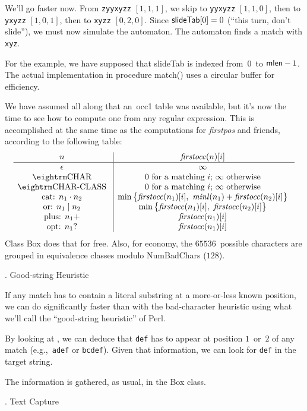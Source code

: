 We'll go faster now. From {\tt zyyxyzz} $[1, 1, 1]$, we skip to {\tt yyxyzz}
$[1, 1, 0]$, then to {\tt yxyzz} $[1, 0, 1]$, then to {\tt xyzz} $[0, 2, 0]$.
Since $\hbox{\sf slideTab}[0] = 0$ (``this turn, don't slide''), we must now
simulate the automaton. The automaton finds a match with {\tt xyz}.

For the example, we have supposed that {\sf slideTab} is indexed from~$0$~to
$\hbox{\sf mlen} - 1$. The actual implementation in procedure {\sf match()}
uses a circular buffer for efficiency.

We have assumed all along that an~{\sf occ1} table was available, but it's now
the time to see how to compute one from any regular expression. This is
accomplished at the same time as the computations for {\it firstpos} and
friends, according to the following table:
  $$\vbox{\halign{\g{#}\vrule && \g{$#$} \cr
    $n$                   & {\it firstocc}(n)[i] \cr
  \noalign{\hrule}
    $\epsilon$            & \infty \cr
    \tok{char}            & \hbox{$0$ for a matching $i$; $\infty$ otherwise} \cr
    \tok{char-class}      & \hbox{$0$ for a matching $i$; $\infty$ otherwise} \cr
    cat: $n_1 \cdot n_2$  & \min\smash{\bigl\{}{\it firstocc}(n_1)[i],\ {\it minl}(n_1) + {\it firstocc}(n_2)[i]\smash{\bigr\}} \cr
    or: $n_1 \mid n_2$    & \min\smash{\bigl\{}{\it firstocc}(n_1)[i],\ {\it firstocc}(n_2)[i]\smash{\bigr\}} \cr
    plus: $n_1+$          & {\it firstocc}(n_1)[i] \cr
    opt: $n_1?$           & {\it firstocc}(n_1)[i] \cr
  }}$$
Class {\sf Box} does that for free. Also, for economy, the $65536$~possible
characters are grouped in equivalence classes modulo {\sf NumBadChars} ($128$).

. Good-string Heuristic

If any match has to contain a literal substring at a more-or-less known
position, we can do significantly faster than with the bad-character heuristic
using what we'll call the ``good-string heuristic'' of Perl.

By looking at , we can deduce that {\tt def} has to appear at
position $1$~or~$2$ of any match (e.g.,~{\tt adef} or {\tt bcdef}). Given that
information, we can look for {\tt def} in the target string.

The information is gathered, as usual, in the {\sf Box} class.

. Text Capture

